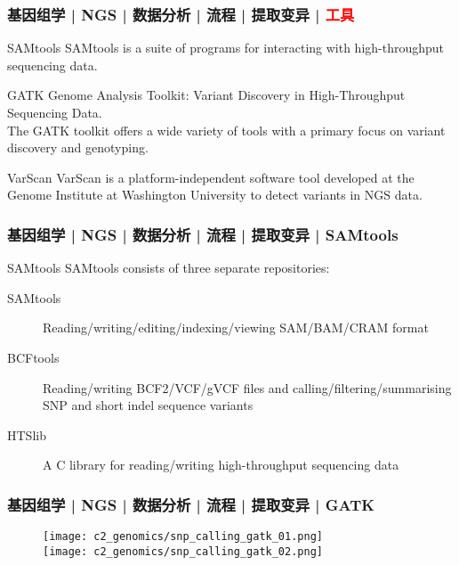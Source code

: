 \begin{frame}
  \frametitle{基因组学 | NGS | 数据分析 | 流程 | 提取变异 | \textcolor{red}{工具}}
  \begin{block}{SAMtools}
    SAMtools is a suite of programs for interacting with high-throughput sequencing data.
  \end{block}
  \pause
  \begin{block}{GATK}
    Genome Analysis Toolkit: Variant Discovery in High-Throughput Sequencing Data.\\
    The GATK toolkit offers a wide variety of tools with a primary focus on variant discovery and genotyping.
  \end{block}
  \pause
  \begin{block}{VarScan}
    VarScan is a platform-independent software tool developed at the Genome Institute at Washington University to detect variants in NGS data.
  \end{block}
\end{frame}

\begin{frame}
  \frametitle{基因组学 | NGS | 数据分析 | 流程 | 提取变异 | SAMtools}
  \begin{block}{SAMtools}
    SAMtools consists of three separate repositories:
    \begin{description}
      \item[SAMtools] Reading/writing/editing/indexing/viewing SAM/BAM/CRAM format
      \item[BCFtools] Reading/writing BCF2/VCF/gVCF files and calling/filtering/summarising SNP and short indel sequence variants
      \item[HTSlib] A C library for reading/writing high-throughput sequencing data
    \end{description}
  \end{block}
\end{frame}

\begin{frame}
  \frametitle{基因组学 | NGS | 数据分析 | 流程 | 提取变异 | GATK}
  \begin{figure}
    \centering
    \texttt{[image: c2\_genomics/snp\_calling\_gatk\_01.png]}\\
    \vspace{1em}
    \texttt{[image: c2\_genomics/snp\_calling\_gatk\_02.png]}
  \end{figure}
\end{frame}

